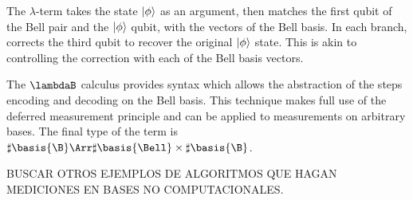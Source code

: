 The $\lambda$-term takes the state $\left\vert{\phi}\right\rangle$ as an argument, then matches the first qubit of the Bell pair and the $\left\vert{\phi}\right\rangle$ qubit, with the vectors of the Bell basis. In each branch, corrects the third qubit to recover the original $\left\vert{\phi}\right\rangle$ state. This is akin to controlling the correction with each of the Bell basis vectors.

The $\lambdaB$ calculus provides syntax which allows the abstraction of the steps encoding and decoding on the Bell basis. This technique makes full use of the deferred measurement principle and can be applied to measurements on arbitrary bases. The final type of the term is $\sharp\basis{\B}\Arr \sharp\basis{\Bell}\times \sharp\basis{\B}$.

{\color{red} BUSCAR OTROS EJEMPLOS DE ALGORITMOS QUE HAGAN MEDICIONES EN BASES NO COMPUTACIONALES.}